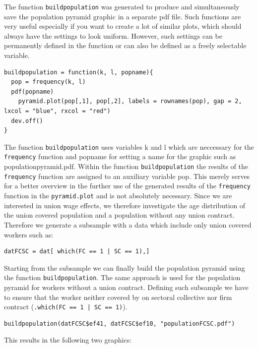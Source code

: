 The function \texttt{buildpopulation} was generated to produce and simultaneously save the population pyramid graphic in a separate pdf file. Such functions are very useful especially if you want to create a lot of similar plots, which should always have the settings to look uniform. However, such settings can be permanently defined in the function or can also be defined as a freely selectable variable.
\lstset{firstnumber = 170}
\begin{lstlisting}
buildpopulation = function(k, l, popname){
  pop = frequency(k, l)
  pdf(popname)
  	pyramid.plot(pop[,1], pop[,2], labels = rownames(pop), gap = 2, lxcol = "blue", rxcol = "red")
  dev.off()
}
\end{lstlisting}
The function \texttt{buildpopulation} uses variables k and l which are neccessary for the \texttt{frequency} function and popname for setting a name for the graphic such as \glqq populationpyramid.pdf\grqq{}. Within the function \texttt{buildpopulation} the results of the \texttt{frequency} function are assigned to an auxiliary variable pop. This merely serves for a better overview in the further use of the generated results of the \texttt{frequency} function in the \texttt{pyramid.plot} and is not absolutely necessary. Since we are interested in union wage effects, we therefore investigate the age distribution of the union covered population and a population without any union contract. Therefore we generate a subsample with a data which include only union covered workers such as:
\lstset{firstnumber = 183}
\begin{lstlisting}
datFCSC = dat[ which(FC == 1 | SC == 1),]
\end{lstlisting}
Starting from the subsample we can finally build the population pyramid using the function \texttt{buildpopulation}. The same approach is used for the population pyramid for workers without a union contract. Defining such subsample we have to ensure that the worker neither covered by on sectoral collective nor firm contract (\texttt{.which(FC == 1 | SC == 1)}). 
\lstset{firstnumber = 189}
\begin{lstlisting}
buildpopulation(datFCSC$ef41, datFCSC$ef10, "populationFCSC.pdf")
\end{lstlisting}
This results in the following two graphics: 

